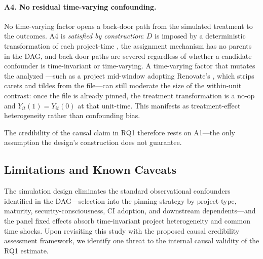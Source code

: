 \paragraph{A4. No residual time-varying confounding.}
No time-varying factor opens a back-door path from the simulated treatment to the outcomes.
A4 is \emph{satisfied by construction}: $D$ is imposed by a deterministic transformation of each project-time , the assignment mechanism has no parents in the DAG, and back-door paths are severed regardless of whether a candidate confounder is time-invariant or time-varying.
A time-varying factor that mutates the analyzed ---such as a project mid-window adopting Renovate's , which strips carets and tildes from the file---can still moderate the size of the within-unit contrast: once the file is already pinned, the treatment transformation is a no-op and $Y_{it}(1) = Y_{it}(0)$ at that unit-time.
This manifests as treatment-effect heterogeneity rather than confounding bias.

The credibility of the causal claim in RQ1 therefore rests on A1---the only assumption the design's construction does not guarantee.

\subsection{Limitations and Known Caveats}
\label{sec:pinning-credibility-limitations}

The simulation design eliminates the standard observational confounders identified in the DAG---selection into the pinning strategy by project type, maturity, security-consciousness, CI adoption, and downstream dependents---and the panel fixed effects absorb time-invariant project heterogeneity and common time shocks.
Upon revisiting this study with the proposed causal credibility assessment framework, we identify one threat to the internal causal validity of the RQ1 estimate.

